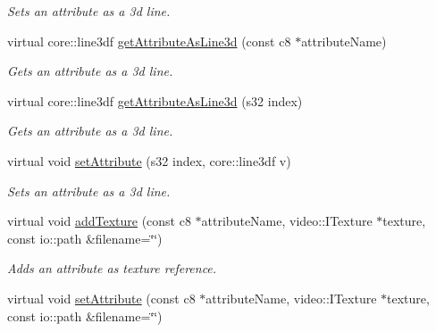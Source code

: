 \begin{DoxyCompactItemize}
\begin{DoxyCompactList}\small\item\em Sets an attribute as a 3d line. \end{DoxyCompactList}\item 
virtual core\-::line3df \hyperlink{classirr_1_1io_1_1_c_attributes_ac2fbb1976c098ff74f114f66dbd4f2d5}{get\-Attribute\-As\-Line3d} (const c8 $\ast$attribute\-Name)
\begin{DoxyCompactList}\small\item\em Gets an attribute as a 3d line. \end{DoxyCompactList}\item 
virtual core\-::line3df \hyperlink{classirr_1_1io_1_1_c_attributes_a49a7a6069ec6c9844ef2b33d9bd4ce88}{get\-Attribute\-As\-Line3d} (s32 index)
\begin{DoxyCompactList}\small\item\em Gets an attribute as a 3d line. \end{DoxyCompactList}\item 
\hypertarget{classirr_1_1io_1_1_c_attributes_a6b2813f6684f1f0aa7856420e0e3feec}{virtual void \hyperlink{classirr_1_1io_1_1_c_attributes_a6b2813f6684f1f0aa7856420e0e3feec}{set\-Attribute} (s32 index, core\-::line3df v)}\label{classirr_1_1io_1_1_c_attributes_a6b2813f6684f1f0aa7856420e0e3feec}

\begin{DoxyCompactList}\small\item\em Sets an attribute as a 3d line. \end{DoxyCompactList}\item 
\hypertarget{classirr_1_1io_1_1_c_attributes_aa3fc306fd3a958e3209fa322a089a35e}{virtual void \hyperlink{classirr_1_1io_1_1_c_attributes_aa3fc306fd3a958e3209fa322a089a35e}{add\-Texture} (const c8 $\ast$attribute\-Name, video\-::\-I\-Texture $\ast$texture, const io\-::path \&filename=\char`\"{}\char`\"{})}\label{classirr_1_1io_1_1_c_attributes_aa3fc306fd3a958e3209fa322a089a35e}

\begin{DoxyCompactList}\small\item\em Adds an attribute as texture reference. \end{DoxyCompactList}\item 
\hypertarget{classirr_1_1io_1_1_c_attributes_a961e25374fbe5a3ef38dfefcbe0c73d8}{virtual void \hyperlink{classirr_1_1io_1_1_c_attributes_a961e25374fbe5a3ef38dfefcbe0c73d8}{set\-Attribute} (const c8 $\ast$attribute\-Name, video\-::\-I\-Texture $\ast$texture, const io\-::path \&filename=\char`\"{}\char`\"{})}\label{classirr_1_1io_1_1_c_attributes_a961e25374fbe5a3ef38dfefcbe0c73d8}


\end{DoxyCompactItemize}
